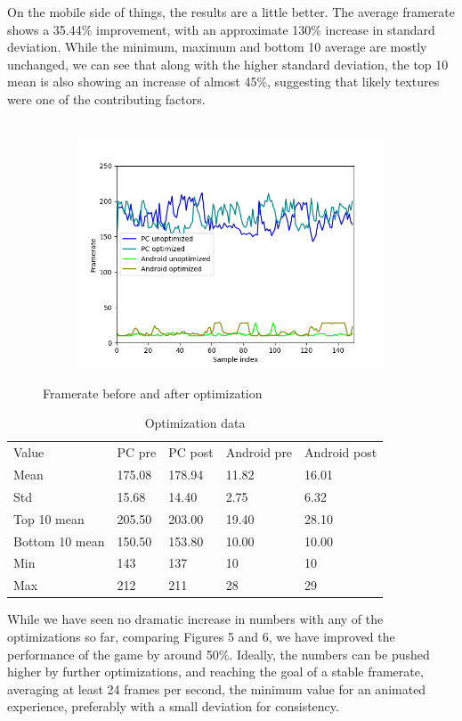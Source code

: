 On the mobile side of things, the results are a little better. The average framerate shows a 35.44\% improvement, with an approximate 130\% increase in standard deviation. While the minimum, maximum and bottom 10 average are mostly unchanged, we can see that along with the higher standard deviation, the top 10 mean is also showing an increase of almost 45\%, suggesting that likely textures were one of the contributing factors. \\ \\
\begin{figure}
\begin{subfigure}{0.49\textwidth}
\includegraphics[width = \textwidth, height = 0.66\textwidth]{images/general}
\end{subfigure}
\caption{Framerate before and after optimization}
\end{figure}
\begin{table}
\caption{Optimization data}
\label{tab:conf}
\begin{minipage}{0.49\textwidth}
\begin{center}
\begin{tabular}{lllll}
Value & PC pre & PC post & Android pre & Android post \\
Mean & 175.08 & 178.94 & 11.82 & 16.01 \\
Std & 15.68 & 14.40 & 2.75 & 6.32 \\
Top 10 mean & 205.50 & 203.00 & 19.40 & 28.10 \\
Bottom 10 mean & 150.50 & 153.80 & 10.00 & 10.00 \\
Min & 143 & 137 & 10 & 10 \\
Max & 212 & 211 & 28 & 29 
\end{tabular}
\bigskip
\end{center} 
\end{minipage}
\end{table}
While we have seen no dramatic increase in numbers with any of the optimizations so far, comparing Figures 5 and 6, we have improved the performance of the game by around 50\%. Ideally, the numbers can be pushed higher by further optimizations, and reaching the goal of a stable framerate, averaging at least 24 frames per second, the minimum value for an animated experience, preferably with a small deviation for consistency. \cite{fpspaper}